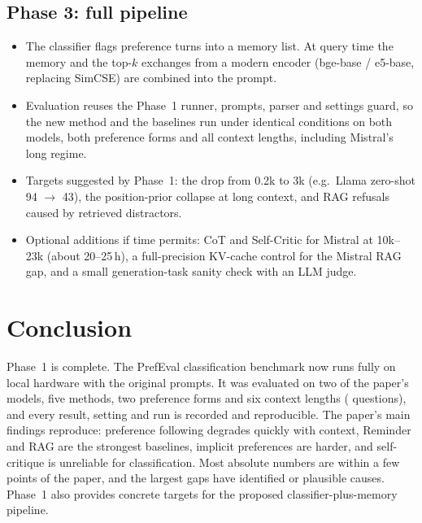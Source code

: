 \documentclass[11pt,a4paper]{article}
\begin{document}
\subsection{Phase 3: full pipeline}
\begin{itemize}
  \item The classifier flags preference turns into a memory list. At query time the memory and the top-$k$ exchanges from a modern encoder
        (bge-base / e5-base, replacing SimCSE) are combined into the prompt.
  \item Evaluation reuses the Phase~1 runner, prompts, parser and settings guard, so the new method and the baselines run under identical
        conditions on both models, both preference forms and all context lengths, including Mistral's long regime.
  \item Targets suggested by Phase~1: the drop from 0.2k to 3k (e.g.\ Llama zero-shot 94 $\rightarrow$ 43), the position-prior
        collapse at long context, and RAG refusals caused by retrieved distractors.
  \item Optional additions if time permits: CoT and Self-Critic for Mistral at 10k--23k (about 20--25\,h), a full-precision KV-cache control
        for the Mistral RAG gap, and a small generation-task sanity check with an LLM judge.
\end{itemize}

\section{Conclusion}
Phase~1 is complete. The PrefEval classification benchmark now runs fully on local hardware with the original prompts. It was
evaluated on two of the paper's models, five methods, two preference forms and six context lengths (\nQuestions{} questions),
and every result, setting and run is recorded and reproducible. The paper's main findings reproduce: preference following degrades
quickly with context, Reminder and RAG are the strongest baselines, implicit preferences are harder, and self-critique is
unreliable for classification. Most absolute numbers are within a few points of the paper, and the largest gaps have identified or
plausible causes. Phase~1 also provides concrete targets for the proposed classifier-plus-memory pipeline.
\end{document}
